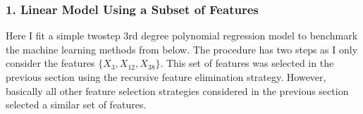\documentclass[letterpaper,10pt,english]{sphinxmanual}
\begin{document}
\begin{sphinxVerbatim}[commandchars=\\\{\}]
      
      

  \PYG{p}{[}\PYG{p}{]}
   

  \PYG{p}{[}\PYG{p}{]}
   
\end{sphinxVerbatim}


\subsubsection{1. Linear Model Using a Subset of Features}
\label{\detokenize{simulated_final:linear-model-using-a-subset-of-features}}
Here I fit a simple two\sphinxhyphen{}step 3rd degree polynomial regression model to benchmark the machine learning methods from below. The procedure has two steps as I only consider the features \(\{X_3, X_{12}, X_{38}\}\). This set of features was selected in the previous section using the recursive feature elimination strategy. However, basically all other feature selection strategies considered in the previous section selected a similar set of features.
\end{document}
